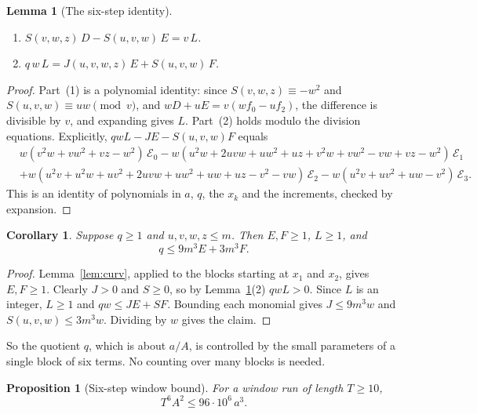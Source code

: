 \documentclass[11pt]{amsart}
\newtheorem{lemma}[theorem]{Lemma}
\newtheorem{proposition}[theorem]{Proposition}
\newtheorem{corollary}[theorem]{Corollary}
\theoremstyle{definition}
\theoremstyle{remark}
\begin{document}
\begin{lemma}[The six-step identity]\label{lem:six}
\begin{enumerate}
\item $S(v,w,z)\,D-S(u,v,w)\,E=v\,L$.
\item $q\,w\,L=J(u,v,w,z)\,E+S(u,v,w)\,F$.
\end{enumerate}
\end{lemma}

\begin{proof}
Part~(1) is a polynomial identity: since $S(v,w,z)\equiv-w^2$ and $S(u,v,w)\equiv uw\pmod v$,
and $wD+uE=v(wf_0-uf_2)$, the difference is divisible by $v$, and expanding gives $L$. Part~(2)
holds modulo the division equations. Explicitly, $qwL-JE-S(u,v,w)F$ equals
\begin{align*}
&w(v^2w+vw^2+vz-w^2)\,\mathcal E_0-w(u^2w+2uvw+uw^2+uz+v^2w+vw^2-vw+vz-w^2)\,\mathcal E_1\\
&+w(u^2v+u^2w+uv^2+2uvw+uw^2+uw+uz-v^2-vw)\,\mathcal E_2-w(u^2v+uv^2+uw-v^2)\,\mathcal E_3 .
\end{align*}
This is an identity of polynomials in $a$, $q$, the $x_k$ and the increments, checked by expansion.
\end{proof}

\begin{corollary}\label{cor:six}
Suppose $q\ge1$ and $u,v,w,z\le m$. Then $E,F\ge1$, $L\ge1$, and
\[
q\le 9m^3E+3m^3F .
\]
\end{corollary}

\begin{proof}
Lemma~\ref{lem:curv}, applied to the blocks starting at $x_1$ and $x_2$, gives $E,F\ge1$.
Clearly $J>0$ and $S\ge0$, so by Lemma~\ref{lem:six}(2) $qwL>0$. Since $L$ is an integer,
$L\ge1$ and $qw\le JE+SF$. Bounding each monomial gives $J\le 9m^3w$ and $S(u,v,w)\le 3m^3w$.
Dividing by $w$ gives the claim.
\end{proof}

So the quotient $q$, which is about $a/A$, is controlled by the small parameters of a single block
of six terms. No counting over many blocks is needed.

\begin{proposition}[Six-step window bound]\label{prop:six}
For a window run of length $T\ge10$,
\[
T^6A^2\le 96\cdot10^6\,a^3 .
\]
\end{proposition}
\end{document}

